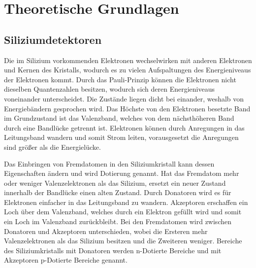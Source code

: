 \chapter{Theoretische Grundlagen}


\section{Siliziumdetektoren}

Die im Silizium vorkommenden Elektronen wechselwirken mit anderen Elektronen und
Kernen des Kristalls, wodurch es zu vielen Aufspaltungen des Energieniveaus der Elektronen kommt. Durch das Pauli-Prinzip können
die Elektronen nicht dieselben Quantenzahlen besitzen, wodurch sich deren Energieniveaus voneinander unterscheidet.
Die Zustände liegen dicht bei einander, weshalb von Energiebändern gesprochen wird.
Das Höchste von den Elektronen besetzte Band im Grundzustand ist das Valenzband, welches von dem
nächsthöheren Band durch eine Bandlücke getrennt ist. Elektronen können
durch Anregungen in das Leitungsband wandern und somit Strom leiten, vorausgesetzt
die Anregungen sind größer als die Energielücke.

Das Einbringen von Fremdatomen in den Siliziumkristall kann dessen Eigenschaften ändern
und wird Dotierung genannt.
Hat das Fremdatom mehr oder weniger Valenzelektronen als das Silizium, ersetzt ein neuer Zustand innerhalb der Bandlücke
einen alten Zustand.
Durch Donatoren wird es für Elektronen einfacher in das Leitungsband zu wandern. Akzeptoren
erschaffen ein Loch über dem Valenzband, welches durch ein Elektron gefüllt wird und somit ein
Loch im Valenzband zurückbleibt.
Bei den Fremdatomen wird zwischen Donatoren und Akzeptoren unterschieden, wobei die
Ersteren mehr Valenzelektronen als das Silizium besitzen und die Zweiteren weniger.
Bereiche des Siliziumkristalls mit Donatoren werden n-Dotierte Bereiche
und mit Akzeptoren p-Dotierte Bereiche genannt.

